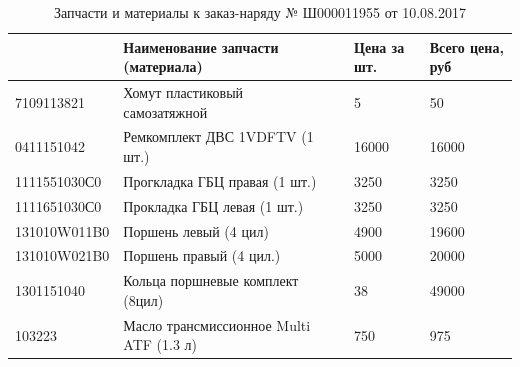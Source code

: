  \begin{table}[H]
 	\centering
  	\caption{{\footnotesize Запчасти и материалы к заказ-наряду № Ш000011955 от 10.08.2017}}
 	\label{tab:4}
 	\begin{tabular}{|l|ll|l|l|}
 		\hline
 		\rowcolor[HTML]{C0C0C0} 
 		\multicolumn{1}{|c|}{\cellcolor[HTML]{C0C0C0}N кат} & Наименование запчасти (материала) & & Цена за шт. & Всего цена, руб \\ \hline
		7109113821    & Хомут пластиковый самозатяжной  & & 5      & 50      \\ \hline
	    \rowcolor[HTML]{EFEFEF} 
		0411151042    & Ремкомплект ДВС 1VDFTV (1 шт.)      & & 16000     & 16000    \\ \hline
		1111551030С0    & Прогкладка ГБЦ правая  (1 шт.)    & & 3250     & 3250      \\ \hline
		\rowcolor[HTML]{EFEFEF} 
		1111651030С0    & Прокладка ГБЦ левая (1 шт.) & & 3250     & 3250      \\ \hline
		131010W011B0    & Поршень левый (4 цил)      & & 4900     & 19600      \\ \hline
		\rowcolor[HTML]{EFEFEF} 
		131010W021B0   & Поршень правый (4 цил.)  & & 5000     & 20000      \\ \hline
		1301151040    & Кольца поршневые комплект (8цил)      & & 38     & 49000      \\ \hline
			\rowcolor[HTML]{EFEFEF} 
 		103223   & Масло трансмиссионное Multi ATF (1.3 л)     & & 750   & 975      \\ \hline
 		\end{tabular}
\end{table}